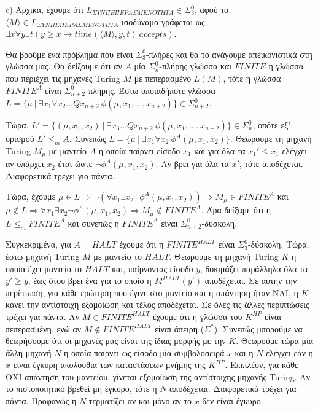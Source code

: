 \documentclass[a4paper, oneside, 11pt]{article}
\theoremstyle{definition}
\begin{document}
c) Αρχικά, έχουμε ότι $L_{\Sigma YN\Pi E\Pi EPA\Sigma MENOTHTA}\in \Sigma_3^0$, αφού το $\langle M\rangle \in L_{\Sigma YN\Pi E\Pi EPA\Sigma MENOTHTA}$ ισοδύναμα γράφεται
ως $\exists x\forall y\exists t (y\geq x \rightarrow time(\langle M\rangle, y, t)\ accepts)$.

Θα βρούμε ένα πρόβλημα που είναι $\Sigma_3^0$-πλήρες και θα το ανάγουμε απεικονιστικά στη γλώσσα μας. Θα δείξουμε ότι αν $A$ μία $\Sigma_n^0$-πλήρης γλώσσα και
$FINITE$ η γλώσσα που περιέχει τις μηχανές Turing $M$ με πεπερασμένο $L(M)$, τότε η γλώσσα $FINITE^A$ είναι $\Sigma_{n+2}^0$-πλήρης.
Έστω οποιαδήποτε γλώσσα $L=\{\mu\ |\ \exists x_1 \forall x_2 \dots Qx_{n+2}\ \phi(\mu,x_1,...,x_{n+2})\}\in \Sigma_{n+2}^0$.


Τώρα, $L'=\{(\mu,x_1,x_2)\ |\ \exists x_3\dots Qx_{n+2}\ \phi(\mu,x_1,...,x_{n+2})\}\in \Sigma_n^0$, οπότε εξ' ορισμού $L'\leq_m A$.
Συνεπώς $L=\{\mu\ |\ \exists x_1\forall x_2\ \phi^A (\mu,x_1,x_2)\}$. Θεωρούμε τη μηχανή Turing $M_{\mu}$ με μαντείο $A$ η οποία παίρνει είσοδο $x_1$ και για όλα τα 
$x_1'\leq x_1$ ελέγχει αν υπάρχει $x_2$ έτσι ώστε $\lnot\phi^A(\mu,x_1,x_2)$. Αν βρει για όλα τα $x'$, τότε αποδέχεται. Διαφορετικά τρέχει για πάντα.

Τώρα, έχουμε $\mu\in L\Rightarrow\lnot(\forall x_1\exists x_2 \lnot\phi^A(\mu,x_1,x_2))\Rightarrow M_{\mu}\in FINITE^A$ και 
$\mu\notin L\Rightarrow \forall x_1\exists x_2\lnot\phi^A(\mu,x_1,x_2)\Rightarrow M_{\mu}\notin FINITE^A$. Άρα δείξαμε ότι η $L\leq_m FINITE^A$ και συνεπώς η
$FINITE^A$ είναι $\Sigma_{n+2}^0$-δύσκολη.

Συγκεκριμένα, για $A=HALT$ έχουμε ότι η $FINITE^{HALT}$ είναι $\Sigma_3^0$-δύσκολη. Τώρα, έστω μηχανή Turing $M$ με μαντείο το $HALT$.
Θεωρούμε τη μηχανή Turing $K$ η οποία έχει μαντείο το $HALT$ και, παίρνοντας είσοδο $y$, δοκιμάζει παράλληλα όλα τα $y'\geq y$, έως ότου βρει ένα για το οποίο
η $M^{HALT}(y')$ αποδέχεται. Σε αυτήν την περίπτωση, για κάθε ερώτηση που έγινε στο μαντείο και η απάντηση ήταν ΝΑΙ, η $K$ κάνει την αντίστοιχη εξομοίωση και τέλος αποδέχεται.
Σε όλες τις άλλες περιπτώσεις τρέχει για πάντα.
Αν $M\in FINITE^{HALT}$ έχουμε ότι η γλώσσα του $K^{HP}$ είναι πεπερασμένη, ενώ αν $M\notin FINITE^{HALT}$ είναι άπειρη ($\Sigma^*$). Συνεπώς μπορούμε να θεωρήσουμε ότι
οι μηχανές μας είναι της ίδιας μορφής με την $K$. Θεωρούμε τώρα μία άλλη μηχανή $N$ η οποία παίρνει ως είσοδο μία συμβολοσειρά $x$ και η $N$ ελέγχει εάν η $x$ είναι έγκυρη
ακολουθία των καταστάσεων μνήμης της $K^{HP}$. Επιπλέον, για κάθε ΟΧΙ απάντηση του μαντείου, γίνεται εξομοίωση της αντίστοιχης μηχανής Turing. Αν το πιστοποιητικό βρεθεί
μη έγκυρο, τότε η $N$ αποδέχεται. Διαφορετικά τρέχει για πάντα. Προφανώς η $N$ τερματίζει αν και μόνο αν το $x$ δεν είναι έγκυρο.
\end{document}
